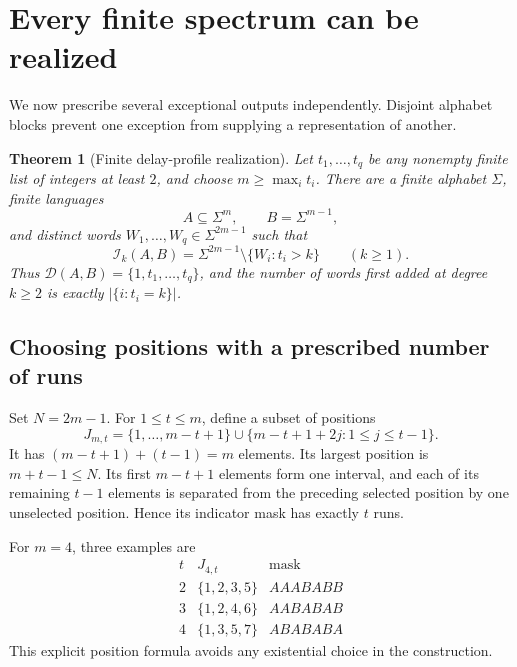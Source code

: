 \documentclass[11pt,letterpaper]{article}
\newtheorem{theorem}{Theorem}[section]
\theoremstyle{definition}\newtheorem{definition}[theorem]{Definition}
\theoremstyle{remark}\newtheorem{remark}[theorem]{Remark}
\theoremstyle{definition}\newtheorem{question}[theorem]{Question}
\newcommand{\ins}[3]{\mathcal I_{#1}(#2,#3)}
\newcommand{\spec}[2]{\mathcal D(#1,#2)}
\begin{document}
\section{Every finite spectrum can be realized}\label{sec:realization}

We now prescribe several exceptional outputs independently. Disjoint alphabet blocks prevent one exception from supplying a representation of another.

\begin{theorem}[Finite delay-profile realization]\label{thm:profile}
Let $t_1,\ldots,t_q$ be any nonempty finite list of integers at least $2$, and choose $m\geq\max_i t_i$. There are a finite alphabet $\Sigma$, finite languages
\[
 A\subseteq\Sigma^m,\qquad B=\Sigma^{m-1},
\]
and distinct words $W_1,\ldots,W_q\in\Sigma^{2m-1}$ such that
\begin{equation}
 \ins{k}{A}{B}
 =\Sigma^{2m-1}\setminus\{W_i:t_i>k\}
 \qquad(k\geq1).
 \label{eq:profile}
\end{equation}
Thus $\spec{A}{B}=\{1,t_1,\ldots,t_q\}$, and the number of words first added at degree $k\geq2$ is exactly $|\{i:t_i=k\}|$.
\end{theorem}

\subsection{Choosing positions with a prescribed number of runs}

Set $N=2m-1$. For $1\leq t\leq m$, define a subset of positions
\begin{equation}
 J_{m,t}=\{1,\ldots,m-t+1\}
 \cup\{m-t+1+2j:1\leq j\leq t-1\}.
 \label{eq:positions}
\end{equation}
It has $(m-t+1)+(t-1)=m$ elements. Its largest position is $m+t-1\leq N$. Its first $m-t+1$ elements form one interval, and each of its remaining $t-1$ elements is separated from the preceding selected position by one unselected position. Hence its indicator mask has exactly $t$ runs.

For $m=4$, three examples are
\[
 \begin{array}{c|c|c}
 t&J_{4,t}&\text{mask}\\
 \hline
 2&\{1,2,3,5\}&AAABABB\\
 3&\{1,2,4,6\}&AABABAB\\
 4&\{1,3,5,7\}&ABABABA
 \end{array}
\]
This explicit position formula avoids any existential choice in the construction.
\end{document}
